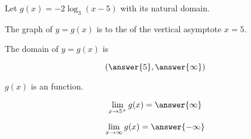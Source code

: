 \documentclass{ximera}
\author{Lee Wayand}
\begin{document}
\begin{exercise}






Let $g(x) = -2 \log_3(x-5)$ with its natural domain. \\





\begin{question}


The graph of $y = g(x)$ is to the  of the vertical asymptote $x = 5$.


\end{question}





\begin{question}


The domain of $y = g(x)$ is 

\[
\left( \answer{5}, \answer{\infty} \right)
\]


\end{question}






\begin{question}


$g(x)$ is an  function.


\end{question}











\begin{question}


\[
\lim\limits_{x \to 5^+} g(x) = \answer{\infty}
\]


\end{question}








\begin{question}


\[
\lim\limits_{x \to \infty} g(x) = \answer{-\infty}
\]


\end{question}










\end{exercise}
\end{document}
